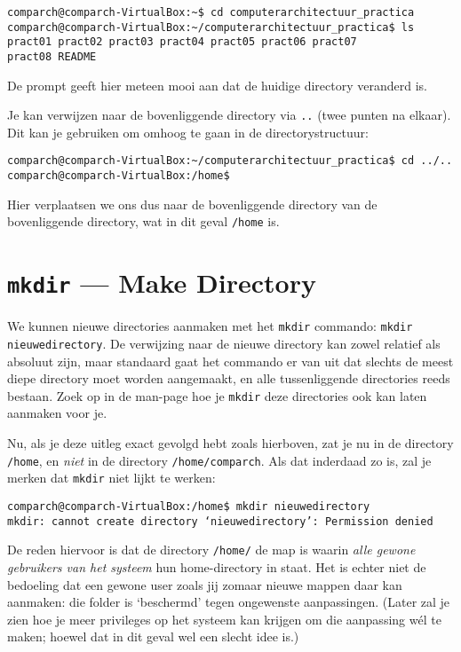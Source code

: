 \documentclass[a4paper,twoside,openany]{memoir}
\begin{document}
\begin{verbatim}
comparch@comparch-VirtualBox:~$ cd computerarchitectuur_practica
comparch@comparch-VirtualBox:~/computerarchitectuur_practica$ ls
pract01 pract02 pract03 pract04 pract05 pract06 pract07
pract08 README
\end{verbatim}

De prompt geeft hier meteen mooi aan dat de huidige directory veranderd is.

Je kan verwijzen naar de bovenliggende directory via \verb!..! (twee
punten na elkaar). Dit kan je gebruiken om omhoog te gaan in de
directorystructuur:
\begin{verbatim}
comparch@comparch-VirtualBox:~/computerarchitectuur_practica$ cd ../..
comparch@comparch-VirtualBox:/home$ 
\end{verbatim}

Hier verplaatsen we ons dus naar de bovenliggende directory van de bovenliggende
directory, wat in dit geval \verb!/home! is.

\section{\texttt{mkdir} --- Make Directory}

We kunnen nieuwe directories aanmaken met het \verb!mkdir! commando: \verb!mkdir nieuwedirectory!. De verwijzing naar de nieuwe directory kan zowel relatief als
absoluut zijn, maar standaard gaat het commando er van uit dat slechts de meest
diepe directory moet worden aangemaakt, en alle tussenliggende directories reeds
bestaan. Zoek op in de man-page hoe je \verb!mkdir! deze directories ook kan
laten aanmaken voor je.

Nu, als je deze uitleg exact gevolgd hebt zoals hierboven, zat je nu in de directory \verb!/home!, en \emph{niet} in de directory \verb!/home/comparch!. Als dat inderdaad zo is, zal je merken dat \verb!mkdir! niet lijkt te werken:
\begin{verbatim}
comparch@comparch-VirtualBox:/home$ mkdir nieuwedirectory
mkdir: cannot create directory ‘nieuwedirectory’: Permission denied
\end{verbatim}

De reden hiervoor is dat de directory \verb!/home/! de map is waarin \emph{alle gewone gebruikers van het systeem} hun home-directory in staat. Het is echter niet de bedoeling dat een gewone user zoals jij zomaar nieuwe mappen daar kan aanmaken: die folder is `beschermd' tegen ongewenste aanpassingen. (Later zal je zien hoe je meer privileges op het systeem kan krijgen om die aanpassing w\'el te maken; hoewel dat in dit geval wel een slecht idee is.)
\end{document}
